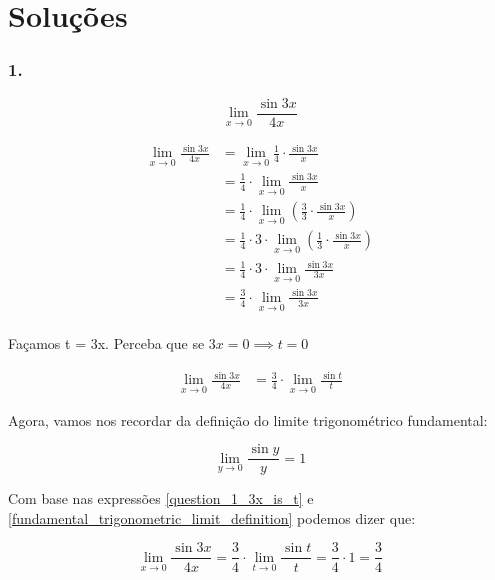 \documentclass{article}
\begin{document}
\section*{Soluções}

\subsubsection*{1.}

\[
    \lim_{x \to 0} \frac{\sin 3x}{4x}
\]


\begin{align*}
    \lim_{x \to 0} \frac{\sin 3x}{4x}
     & = \lim_{x \to 0} \frac{1}{4} \cdot \frac{\sin 3x}{x}                                        \\
     & = \frac{1}{4} \cdot \lim_{x \to 0} \frac{\sin 3x}{x}                                        \\
     & = \frac{1}{4} \cdot \lim_{x \to 0} \left(\frac{3}{3} \cdot \frac{\sin 3x}{x}\right)         \\
     & = \frac{1}{4} \cdot 3 \cdot \lim_{x \to 0} \left(\frac{1}{3} \cdot \frac{\sin 3x}{x}\right) \\
     & = \frac{1}{4} \cdot 3 \cdot \lim_{x \to 0}  \frac{\sin 3x}{3x}                              \\
     & = \frac{3}{4} \cdot \lim_{x \to 0}  \frac{\sin 3x}{3x}                                      \\
\end{align*}

Façamos t = 3x. Perceba que se \(3x = 0 \implies t = 0 \)

\begin{align} \label{question_1_3x_is_t}
    \lim_{x \to 0} \frac{\sin 3x}{4x}
     & = \frac{3}{4} \cdot \lim_{x \to 0}  \frac{\sin t}{t}
\end{align}


Agora, vamos nos recordar da definição do limite trigonométrico fundamental:


\begin{equation} \label{fundamental_trigonometric_limit_definition}
    \lim_{y \to 0} \frac{\sin y}{y} = 1
\end{equation}

Com base nas expressões \ref{question_1_3x_is_t} e \ref{fundamental_trigonometric_limit_definition}
podemos dizer que:

\[
    \lim_{x \to 0} \frac{\sin 3x}{4x}
    = \frac{3}{4} \cdot \lim_{t \to 0}  \frac{\sin t}{t}
    = \frac{3}{4} \cdot 1
    = \frac{3}{4}
\]
\end{document}
